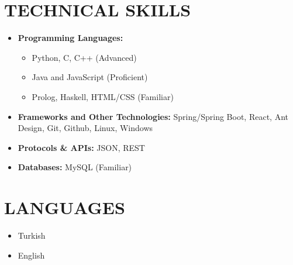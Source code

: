 \begin{minipage}[t]{0.8\textwidth}
  \section{TECHNICAL SKILLS}
    \begin{multicols}{2}
      \begin{itemize}[leftmargin=0.25in, itemsep=1pt]
        \item \textbf{Programming Languages:} 
          \begin{itemize}[label={-}, leftmargin=0.2in]
            \item Python, C, C++ (Advanced)
            \item Java and JavaScript (Proficient)
            \item Prolog, Haskell, HTML/CSS (Familiar)
          \end{itemize}
        \vspace*{\fill}



        \item \textbf{Frameworks and Other Technologies:} 
          Spring/Spring Boot, React, Ant Design, Git, Github, Linux, Windows
        
        \item \textbf{Protocols \& APIs:} 
          JSON, REST

        \item \textbf{Databases:} 
          MySQL (Familiar)
      \end{itemize}
    \end{multicols}
\end{minipage}
\begin{minipage}[t]{0.18\textwidth}
  \section{LANGUAGES}
  \begin{itemize}[leftmargin=0.25in, itemsep=1pt]
    \item Turkish
    \item English
  \end{itemize}
\end{minipage}
